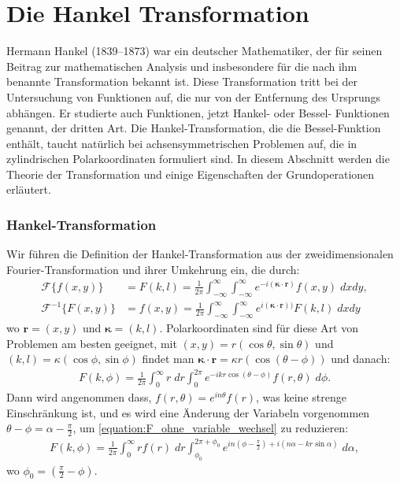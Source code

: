 %
%

\section{Die Hankel Transformation \label{kreismembran:section:teil2}}

Hermann Hankel (1839--1873) war ein deutscher Mathematiker, der für seinen Beitrag zur mathematischen Analysis und insbesondere für die nach ihm benannte Transformation bekannt ist.
Diese Transformation tritt bei der Untersuchung von Funktionen auf, die nur von der Entfernung des Ursprungs abhängen.
Er studierte auch Funktionen, jetzt Hankel- oder Bessel- Funktionen genannt, der dritten Art.
Die Hankel-Transformation, die die Bessel-Funktion enthält, taucht natürlich bei achsensymmetrischen Problemen auf, die in zylindrischen Polarkoordinaten formuliert sind.
In diesem Abschnitt werden die Theorie der Transformation und einige Eigenschaften der Grundoperationen erläutert.

\subsubsection{Hankel-Transformation \label{subsub:hankel_tansformation}}
Wir führen die Definition der Hankel-Transformation \cite{lokenath_debnath_integral_2015} aus der zweidimensionalen Fourier-Transformation und ihrer Umkehrung ein, die durch:
\begin{align}
	\mathscr{F}\{f(x,y)\} & = F(k,l)=\frac{1}{2\pi}\int_{-\infty}^{\infty}\int_{-\infty}^{\infty}e^{-i( \bm{\kappa}\cdot \mathbf{r})}f(x,y) \; dx dy,\label{equation:fourier_transform}\\
	\mathscr{F}^{-1}\{F(x,y)\} & = f(x,y)=\frac{1}{2\pi}\int_{-\infty}^{\infty}\int_{-\infty}^{\infty}e^{i(\bm{\kappa}\cdot \mathbf{r}))}F(k,l) \; dx dy \label{equation:inv_fourier_transform}
\end{align}
wo $\mathbf{r}=(x,y)$ und $\bm{\kappa}=(k,l)$. Polarkoordinaten sind für diese Art von Problemen am besten geeignet, mit $(x,y)=r(\cos\theta,\sin\theta)$ und $(k,l)=\kappa(\cos\phi,\sin\phi)$ findet man $\bm{\kappa}\cdot\mathbf{r}=\kappa r(\cos(\theta-\phi))$ und danach:
\begin{align}
	F(k,\phi)=\frac{1}{2\pi}\int_{0}^{\infty}r \; dr \int_{0}^{2\pi}e^{-ikr\cos(\theta-\phi)}f(r,\theta) \; d\phi.
	\label{equation:F_ohne_variable_wechsel}
\end{align}
Dann wird angenommen dass, $f(r,\theta)=e^{in\theta}f(r)$, was keine strenge Einschränkung ist, und es wird eine Änderung der Variabeln vorgenommen $\theta-\phi=\alpha-\frac{\pi}{2}$, um \eqref{equation:F_ohne_variable_wechsel} zu reduzieren:
\begin{align}
	F(k,\phi)=\frac{1}{2\pi}\int_{0}^{\infty}rf(r) \; dr \int_{\phi_{0}}^{2\pi+\phi_{0}}e^{in(\phi-\frac{\pi}{2})+i(n\alpha-kr\sin\alpha)} \; d\alpha,
	\label{equation:F_ohne_bessel}
\end{align}
wo $\phi_{0}=(\frac{\pi}{2}-\phi)$.

